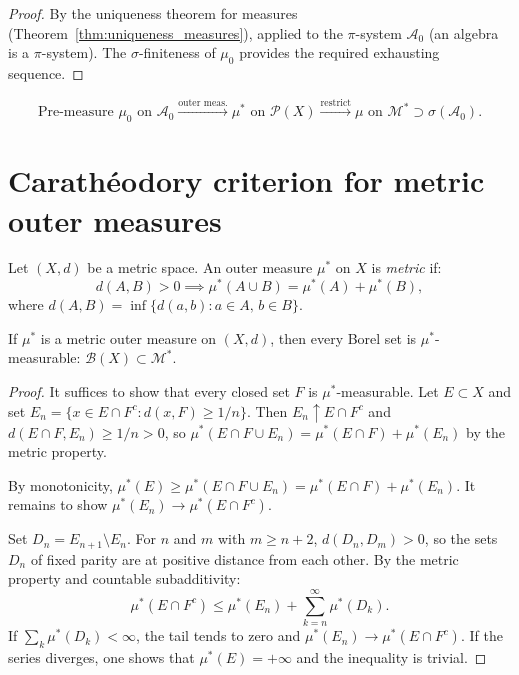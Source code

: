 \begin{proof}
By the uniqueness theorem for measures (Theorem~\ref{thm:uniqueness_measures}),
applied to the $\pi$-system $\mathcal{A}_0$ (an algebra is a $\pi$-system). The
$\sigma$-finiteness of $\mu_0$ provides the required exhausting sequence.
\end{proof}

\begin{keyformulas}[title=\textbf{Summary of the Carath\'eodory construction}]
\[
\text{Pre-measure } \mu_0 \text{ on } \mathcal{A}_0
\xrightarrow{\text{outer meas.}} \mu^* \text{ on } \mathcal{P}(X)
\xrightarrow{\text{restrict}} \mu \text{ on } \mathcal{M}^*
\supset \sigma(\mathcal{A}_0).
\]
\end{keyformulas}

\section{Carath\'eodory criterion for metric outer measures}

\begin{definition}
Let $(X, d)$ be a metric space. An outer measure $\mu^*$ on $X$ is \emph{metric} if:
\[
d(A, B) > 0 \implies \mu^*(A \cup B) = \mu^*(A) + \mu^*(B),
\]
where $d(A, B) = \inf\{d(a, b) : a \in A,\, b \in B\}$.
\end{definition}

\begin{theorem}
If $\mu^*$ is a metric outer measure on $(X, d)$, then every Borel set is
$\mu^*$-measurable: $\mathcal{B}(X) \subset \mathcal{M}^*$.
\end{theorem}

\begin{proof}
It suffices to show that every closed set $F$ is $\mu^*$-measurable. Let
$E \subset X$ and set $E_n = \{x \in E \cap F^c : d(x, F) \geq 1/n\}$. Then
$E_n \uparrow E \cap F^c$ and $d(E \cap F, E_n) \geq 1/n > 0$, so
$\mu^*(E \cap F \cup E_n) = \mu^*(E \cap F) + \mu^*(E_n)$ by the metric property.

By monotonicity, $\mu^*(E) \geq \mu^*(E \cap F \cup E_n) = \mu^*(E \cap F) +
\mu^*(E_n)$. It remains to show $\mu^*(E_n) \to \mu^*(E \cap F^c)$.

Set $D_n = E_{n+1} \setminus E_n$. For $n$ and $m$ with $m \geq n + 2$,
$d(D_n, D_m) > 0$, so the sets $D_n$ of fixed parity are at positive distance from
each other. By the metric property and countable subadditivity:
\[
\mu^*(E \cap F^c) \leq \mu^*(E_n) + \sum_{k=n}^{\infty} \mu^*(D_k).
\]
If $\sum_k \mu^*(D_k) < \infty$, the tail tends to zero and
$\mu^*(E_n) \to \mu^*(E \cap F^c)$. If the series diverges, one shows that
$\mu^*(E) = +\infty$ and the inequality is trivial.
\end{proof}

